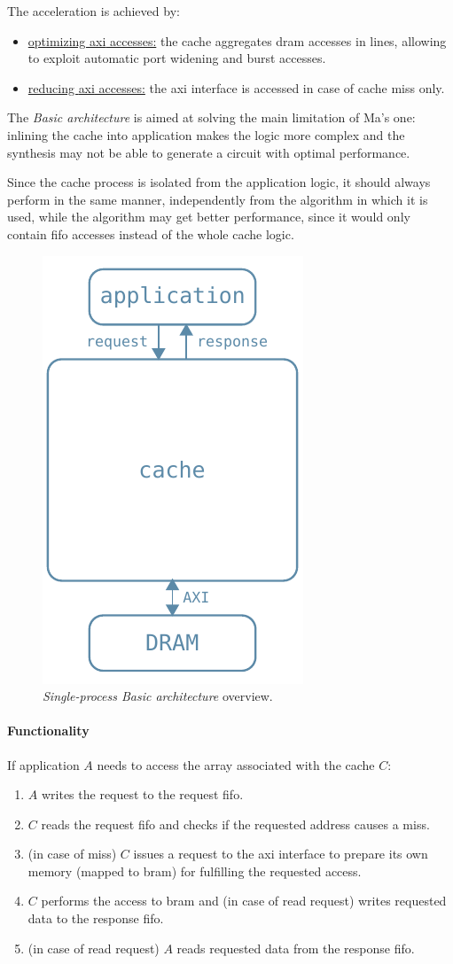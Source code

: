 \documentclass[11pt,a4paper,oneside]{memoir}
\begin{document}
The acceleration is achieved by:
\begin{itemize}
	\item \underline{optimizing \ac{axi} accesses:} the cache aggregates
		\ac{dram} accesses in lines, allowing to exploit automatic port
		widening and burst accesses.
	\item \underline{reducing \ac{axi} accesses:} the \ac{axi} interface is
		accessed in case of cache miss only.
\end{itemize}

The \emph{Basic architecture} is aimed at solving the main limitation of Ma's
one: inlining the cache into application makes the logic more complex and the
synthesis may not be able to generate a circuit with optimal performance.

Since the cache process is isolated from the application logic, it should
always perform in the same manner, independently from the algorithm in which it
is used, while the algorithm may get better performance, since it would only
contain \ac{fifo} accesses instead of the whole cache logic.

\begin{figure}
	\centering
	\includegraphics[width=.3\textwidth]{single_proc_basic_arch}
	\caption{\emph{Single-process Basic architecture} overview.}
	\label{fig:single_proc_basic_arch}
\end{figure}

\paragraph{Functionality}
If application $A$ needs to access the array associated with the cache $C$:
\begin{enumerate}
	\item $A$ writes the request to the request \ac{fifo}.
	\item $C$ reads the request \ac{fifo} and checks if the requested
		address causes a miss.
	\item (in case of miss) $C$ issues a request to the \ac{axi} interface
		to prepare its own memory (mapped to \ac{bram}) for fulfilling
		the requested access.
	\item $C$ performs the access to \ac{bram} and (in case of read
		request) writes requested data to the response \ac{fifo}.
	\item (in case of read request) $A$ reads requested data from the
		response \ac{fifo}.
\end{enumerate}
\end{document}
